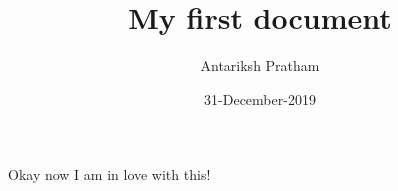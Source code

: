 \documentclass{article}
\title{My first document}
\date{31-December-2019}
\author{Antariksh Pratham}
\begin{document}
  \maketitle
  \newpage

  Okay now I am in love with this!
\end{document}
